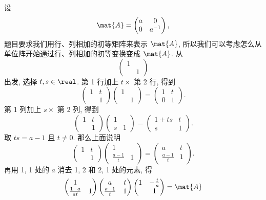\begin{solution}
设
\[
\mat{A} = \begin{pmatrix}a & 0 \\ 0 & a^{-1} \end{pmatrix},
\]
题目要求我们用行、列相加的初等矩阵来表示 $\mat{A}$, 所以我们可以考虑怎么从单位阵开始通过行、列相加的初等变换变成 $\mat{A}$. 从
\[
\begin{pmatrix} 1 & \\  & 1 \end{pmatrix}
\]
出发, 选择 $t, s \in \real$. 第 1 行加上 $t \times$ 第 2 行, 得到
\[
    \begin{pmatrix} 1 & t \\  & 1 \end{pmatrix} \begin{pmatrix} 1 & \\  & 1 \end{pmatrix} = \begin{pmatrix}1 & t \\ 0 & 1 \end{pmatrix}.
\]
第 1 列加上 $s \times$ 第 2 列, 得到
\[
     \begin{pmatrix} 1 & t \\  & 1 \end{pmatrix} \begin{pmatrix} 1 &  \\ s & 1 \end{pmatrix} = \begin{pmatrix}1 + ts & t \\ s & 1 \end{pmatrix}.
\]
取 $ts = a - 1$ 且 $t \not= 0$. 那么上面说明
\[
     \begin{pmatrix} 1 & t \\  & 1 \end{pmatrix} \begin{pmatrix} 1 &  \\ \frac{a - 1}{t} & 1 \end{pmatrix} = \begin{pmatrix} a & t \\ \frac{a - 1}{t} & 1 \end{pmatrix}.
\]
再用 1, 1 处的 $a$ 消去 1, 2 和 2, 1 处的元素, 得
\[
    \begin{pmatrix} 1 &  \\ \frac{1 - a}{at} & 1 \end{pmatrix} \begin{pmatrix} a & t \\ \frac{a - 1}{t} & 1 \end{pmatrix} \begin{pmatrix} 1 & -\frac{t}{a} \\  & 1 \end{pmatrix} = \mat{A}
\]
\end{solution}
